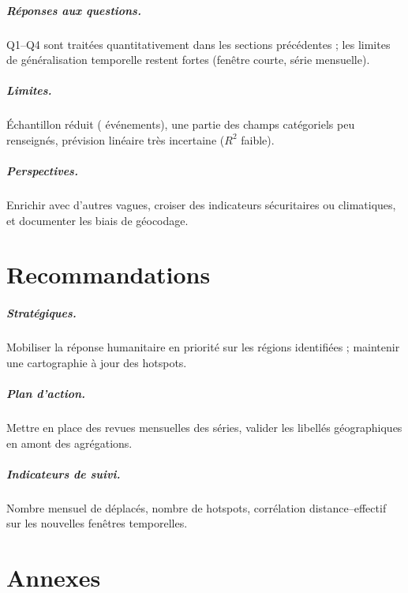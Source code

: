 \documentclass[11pt,a4paper]{report}
\begin{document}
\paragraph{Réponses aux questions.}
Q1--Q4 sont traitées quantitativement dans les sections précédentes ; les limites de
généralisation temporelle restent fortes (fenêtre courte, série mensuelle).

\paragraph{Limites.}
Échantillon réduit (\EventsGeo{} événements), une partie des champs catégoriels peu renseignés,
prévision linéaire très incertaine ($R^2$ faible).

\paragraph{Perspectives.}
Enrichir avec d'autres vagues, croiser des indicateurs sécuritaires ou climatiques, et documenter
les biais de géocodage.

\chapter{Recommandations}

\paragraph{Stratégiques.}
Mobiliser la réponse humanitaire en priorité sur les régions identifiées ; maintenir une cartographie
à jour des hotspots.

\paragraph{Plan d'action.}
Mettre en place des revues mensuelles des séries, valider les libellés géographiques en amont des
agrégations.

\paragraph{Indicateurs de suivi.}
Nombre mensuel de déplacés, nombre de hotspots, corrélation distance--effectif sur les nouvelles
fenêtres temporelles.

\chapter{Annexes}
\end{document}
